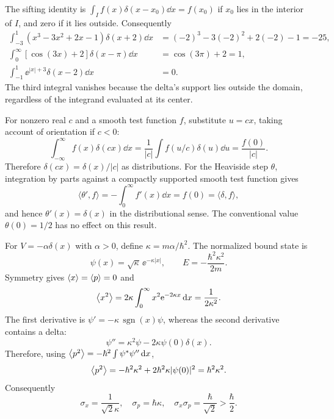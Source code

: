The sifting identity is
$\int_I f(x)\delta(x-x_0)\dd x=f(x_0)$
if $x_0$ lies in the interior of $I$, and zero if it
lies outside. Consequently
\begin{align}
\int_{-3}^{1}(x^3-3x^2+2x-1)\delta(x+2)\dd x
&=(-2)^3-3(-2)^2+2(-2)-1=\boxed{-25},\\
\int_0^\infty[\cos(3x)+2]\delta(x-\pi)\dd x
&=\cos(3\pi)+2=\boxed{1},\\
\int_{-1}^{1}\ee^{|x|+3}\delta(x-2)\dd x
&=\boxed{0}.
\end{align}
The third integral vanishes because the delta's support
lies outside the domain, regardless of the integrand
evaluated at its center.

For nonzero real $c$ and a smooth test function $f$,
substitute $u=cx$, taking account of orientation if
$c<0$:
\begin{equation}
\int_{-\infty}^{\infty}f(x)\delta(cx)\dd x
=\frac1{|c|}\int f(u/c)\delta(u)\dd u
=\frac{f(0)}{|c|}.
\end{equation}
Therefore $\boxed{\delta(cx)=\delta(x)/|c|}$ as
distributions. For the Heaviside step $\theta$,
integration by parts against a compactly supported
smooth test function gives
\begin{equation}
\langle\theta',f\rangle
=-\int_0^\infty f'(x)\dd x=f(0)
=\langle\delta,f\rangle,
\end{equation}
and hence $\boxed{\theta'(x)=\delta(x)}$
in the distributional sense. The conventional
value $\theta(0)=1/2$ has no effect on this result.

For $V=-\alpha\delta(x)$ with $\alpha>0$, define
$\kappa=m\alpha/\hbar^2$. The normalized bound state is
\begin{equation}
\psi(x)=\sqrt\kappa\,\ee^{-\kappa|x|},
\qquad E=-\frac{\hbar^2\kappa^2}{2m}.
\end{equation}
Symmetry gives $\left\langle x\right\rangle=\left\langle p\right\rangle=0$ and
\begin{equation}
\left\langle x^2\right\rangle=2\kappa\int_0^\infty
x^2\mathrm e^{-2\kappa x}\,\mathrm d x=\frac1{2\kappa^2}.
\end{equation}
The first derivative is
$\psi'=-\kappa\,\operatorname{sgn}(x)\psi$,
whereas the second derivative contains a delta:
\begin{equation}
\psi''=\kappa^2\psi-2\kappa\psi(0)\delta(x).
\end{equation}
Therefore, using $\left\langle p^2\right\rangle=-\hbar^2\int\psi^*\psi''\,\mathrm d x$,
\begin{equation}
\left\langle p^2\right\rangle=-\hbar^2\kappa^2+
2\hbar^2\kappa|\psi(0)|^2
=\hbar^2\kappa^2.
\end{equation}
Consequently
\begin{equation}
\boxed{\sigma_x=\frac1{\sqrt2\kappa},\quad
\sigma_p=\hbar\kappa,\quad
\sigma_x\sigma_p=\frac{\hbar}{\sqrt2}>
\frac{\hbar}{2}}.
\end{equation}

